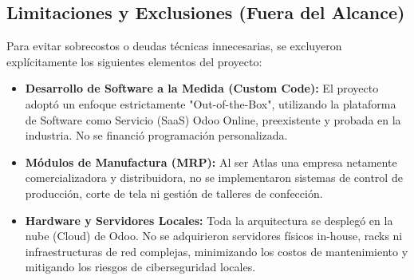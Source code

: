 \subsection{Limitaciones y Exclusiones (Fuera del Alcance)}
Para evitar sobrecostos o deudas técnicas innecesarias, se excluyeron explícitamente los siguientes elementos del proyecto:
\begin{itemize}
    \item \textbf{Desarrollo de Software a la Medida (Custom Code):} El proyecto adoptó un enfoque estrictamente "Out-of-the-Box", utilizando la plataforma de Software como Servicio (SaaS) Odoo Online, preexistente y probada en la industria. No se financió programación personalizada.
    \item \textbf{Módulos de Manufactura (MRP):} Al ser Atlas una empresa netamente comercializadora y distribuidora, no se implementaron sistemas de control de producción, corte de tela ni gestión de talleres de confección.
    \item \textbf{Hardware y Servidores Locales:} Toda la arquitectura se desplegó en la nube (Cloud) de Odoo. No se adquirieron servidores físicos in-house, racks ni infraestructuras de red complejas, minimizando los costos de mantenimiento y mitigando los riesgos de ciberseguridad locales.
\end{itemize}
